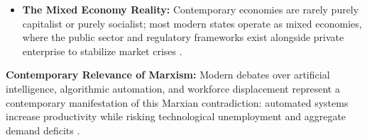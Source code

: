 \begin{itemize}
    \item \textbf{The Mixed Economy Reality:} Contemporary economies are rarely purely capitalist or purely socialist; most modern states operate as mixed economies, where the public sector and regulatory frameworks exist alongside private enterprise to stabilize market crises .
\end{itemize}

\begin{PYQLink}
\textbf{Contemporary Relevance of Marxism:}
Modern debates over artificial intelligence, algorithmic automation, and workforce displacement represent a contemporary manifestation of this Marxian contradiction: automated systems increase productivity while risking technological unemployment and aggregate demand deficits .
\end{PYQLink}

\clearpage